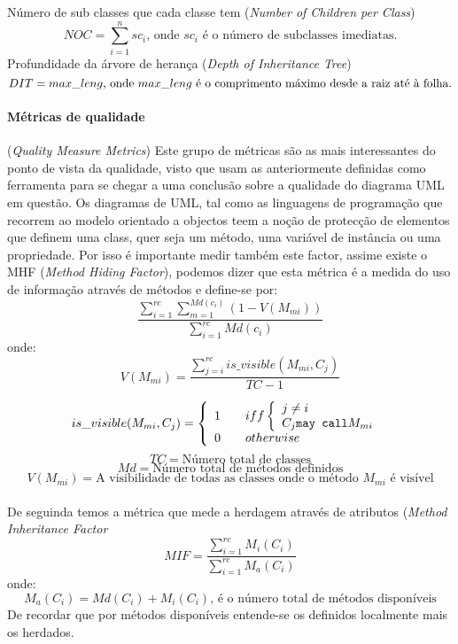 Número de sub classes que cada classe tem (\textit{Number of Children per Class})
\begin{displaymath}
NOC = \sum_{i=1}^{n} sc_i  \textrm{, onde $sc_i$ é o número de subclasses imediatas.}
\end{displaymath}
Profundidade da árvore de herança (\textit{Depth of Inheritance Tree})
\begin{displaymath}
DIT = max\_leng  \textrm{, onde $ max\_leng $ é o comprimento máximo desde a raiz até à folha.}
\end{displaymath}

\paragraph{Métricas de qualidade} (\textit{Quality Measure Metrics}) Este grupo de métricas são as mais interessantes do ponto de vista da qualidade, visto que
usam as anteriormente definidas como ferramenta para se chegar a uma conclusão sobre a qualidade do diagrama UML em questão.
Os diagramas de UML, tal como as linguagens de programação que recorrem ao modelo orientado a objectos teem a noção de protecção de elementos que definem uma class,
quer seja um método, uma variável de instância ou uma propriedade. Por isso é importante medir também este factor, assime existe o MHF (\textit{Method Hiding Factor}),
podemos dizer que esta métrica é a medida do uso de informação através de métodos e define-se por:
\begin{displaymath}
\frac{\sum_{i=1}^{rc} \sum_{m=1}^{Md(c_i)} (1-V(M_{mi}))} {\sum_{i=1}^{rc} Md(c_i)}
\end{displaymath}
onde:
$$V(M_{mi}) = \frac{\sum_{j=i}^{rc} is\_visible(M_{mi},C_j)}{TC-1} $$

\[ is\_visible(M_{mi},C_j) = \left\{ \begin{array}{l l}
	1 & \quad iff \left \{
		\begin{array}{l l}
			j \neq i \\
			C_j \texttt{may call} M_{mi}\\
		\end{array}
	\right.\\
0 & \quad otherwise\\
\end{array} \right. \]
$$TC = \textrm{Número total de classes}$$
$$Md = \textrm{Número total de métodos definidos}$$
$$V(M_{mi}) = \textrm{A visibilidade de todas as classes onde o método $M_{mi}$ é visível}$$
\\
De seguinda temos a métrica que mede a herdagem através de atributos (\textit{Method Inheritance Factor} $$MIF = \frac{\sum_{i=1}^{rc} M_i(C_i)}{\sum_{i=1}^{rc} M_a(C_i)} $$
onde:
$$ M_a(C_i) = Md(C_i) + M_i(C_i)\textrm{, é o número total de métodos disponíveis}$$
De recordar que por métodos disponíveis entende-se os definidos localmente mais os herdados.

